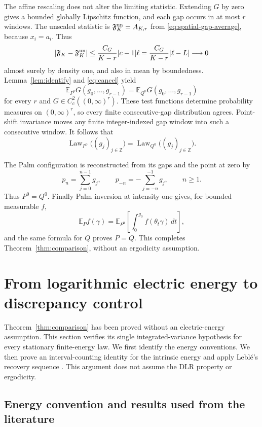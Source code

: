 \documentclass[11pt,reqno]{amsart}
\numberwithin{equation}{section}
\theoremstyle{definition}
\theoremstyle{remark}
\newcommand{\Z}{\mathbb Z}
\newcommand{\E}{\mathbb E}
\newcommand{\1}{\mathbf 1}
\DeclareMathOperator{\Law}{Law}
\newcommand{\dd}{\,d}
\begin{document}
The affine rescaling does not alter the limiting statistic. Extending
$G$ by zero gives a bounded globally Lipschitz function, and each gap
occurs in at most $r$ windows. The unscaled statistic is $\mathfrak F_K^{\rm un}=A_{K,r}$ from
\eqref{eq:spatial-gap-average}, because $x_i=a_i$. Thus
\[
|\mathfrak F_K-\mathfrak F_K^{\rm un}|
\le\frac{C_G}{K-r}|c-1|\ell
=\frac{C_G}{K-r}|\ell-L|\longrightarrow0
\]
almost surely by density one, and also in mean by boundedness.
Lemma~\ref{lem:identify} and \eqref{eq:cancel} yield
\[
\E_{P^0}G(g_0,\ldots,g_{r-1})
=\E_{Q^0}G(g_0,\ldots,g_{r-1})
\]
for every $r$ and $G\in C_c^2((0,\infty)^r)$.
These test functions determine probability measures on
$(0,\infty)^r$, so every finite consecutive-gap distribution agrees.
Point-shift invariance moves any finite integer-indexed gap window
into such a consecutive window. It follows that
\begin{equation}\label{eq:gap-law-equality}
\Law_{P^0}\bigl((g_j)_{j\in\Z}\bigr)
 =\Law_{Q^0}\bigl((g_j)_{j\in\Z}\bigr).
\end{equation}

The Palm configuration is reconstructed from its gaps and the point
at zero by
\[
p_n=\sum_{j=0}^{n-1}g_j,\qquad
p_{-n}=-\sum_{j=-n}^{-1}g_j,\qquad n\ge1.
\]
Thus $P^0=Q^0$. Finally Palm inversion at intensity one gives, for
bounded measurable $f$,
\[
\E_P f(\gamma)=
\E_{P^0}\left[\int_0^{g_0}f(\theta_t\gamma)\dd t\right],
\]
and the same formula for $Q$ proves $P=Q$. This completes
Theorem~\ref{thm:comparison}, without an ergodicity assumption.


\section{From logarithmic electric energy to discrepancy control}
\label{sec:energy}

Theorem~\ref{thm:comparison} has been proved without an electric-energy
assumption. This section verifies its single integrated-variance
hypothesis for every stationary finite-energy law. We first identify
the energy conventions. We then prove an interval-counting identity
for the intrinsic energy and apply Lebl\'e's recovery sequence
\cite[Proposition~5.3]{Leble}. This argument does not assume the DLR
property or ergodicity.

\subsection{Energy convention and results used from the literature}
\end{document}
